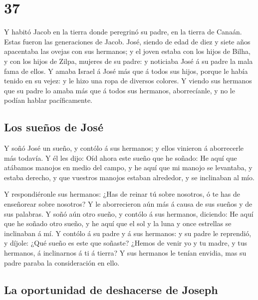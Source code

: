 \hypertarget{section-36}{%
\section{37}\label{section-36}}

 Y habitó Jacob en la tierra donde peregrinó su padre, en
la tierra de Canaán.  Estas fueron las generaciones de
Jacob. José, siendo de edad de diez y siete años apacentaba las ovejas
con sus hermanos; y el joven estaba con los hijos de Bilha, y con los
hijos de Zilpa, mujeres de su padre: y noticiaba José á su padre la mala
fama de ellos.  Y amaba Israel á José más que á todos sus
hijos, porque le había tenido en su vejez: y le hizo una ropa de
diversos colores.  Y viendo sus hermanos que su padre lo
amaba más que á todos sus hermanos, aborrecíanle, y no le podían hablar
pacíficamente.

\hypertarget{los-sueuxf1os-de-josuxe9}{%
\subsection{Los sueños de José}\label{los-sueuxf1os-de-josuxe9}}

 Y soñó José un sueño, y contólo á sus hermanos; y ellos
vinieron á aborrecerle más todavía.  Y él les dijo: Oíd
ahora este sueño que he soñado:  He aquí que atábamos
manojos en medio del campo, y he aquí que mi manojo se levantaba, y
estaba derecho, y que vuestros manojos estaban alrededor, y se
inclinaban al mío.

 Y respondiéronle sus hermanos: ¿Has de reinar tú sobre
nosotros, ó te has de enseñorear sobre nosotros? Y le aborrecieron aún
más á causa de sus sueños y de sus palabras.  Y soñó aún
otro sueño, y contólo á sus hermanos, diciendo: He aquí que he soñado
otro sueño, y he aquí que el sol y la luna y once estrellas se
inclinaban á mí.  Y contólo á su padre y á sus hermanos:
y su padre le reprendió, y díjole: ¿Qué sueño es este que soñaste?
¿Hemos de venir yo y tu madre, y tus hermanos, á inclinarnos á ti á
tierra?  Y sus hermanos le tenían envidia, mas su padre
paraba la consideración en ello.

\hypertarget{la-oportunidad-de-deshacerse-de-joseph}{%
\subsection{La oportunidad de deshacerse de
Joseph}\label{la-oportunidad-de-deshacerse-de-joseph}}

